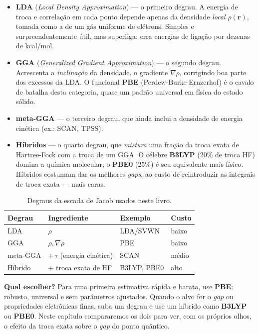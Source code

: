 \begin{itemize}[leftmargin=*]
  \item \textbf{LDA} (\emph{Local Density Approximation}) --- o primeiro degrau.
        A energia de troca e correlação em cada ponto depende apenas da densidade
        \emph{local} $\rho(\mathbf{r})$, tomada como a de um gás uniforme de
        elétrons. Simples e surpreendentemente útil, mas superliga: erra energias
        de ligação por dezenas de kcal/mol.
  \item \textbf{GGA} (\emph{Generalized Gradient Approximation}) --- o segundo
        degrau. Acrescenta a \emph{inclinação} da densidade, o gradiente
        $\nabla\rho$, corrigindo boa parte dos excessos da LDA. O funcional
        \textbf{PBE} (Perdew-Burke-Ernzerhof) é o cavalo de batalha desta
        categoria, quase um padrão universal em física do estado sólido.
  \item \textbf{meta-GGA} --- o terceiro degrau, que ainda inclui a densidade de
        energia cinética (ex.: SCAN, TPSS).
  \item \textbf{Híbridos} --- o quarto degrau, que \emph{mistura} uma fração da
        troca exata de Hartree-Fock com a troca de um GGA. O célebre \textbf{B3LYP}
        (20\% de troca HF) domina a química molecular; o \textbf{PBE0} (25\%) é seu
        equivalente mais físico. Híbridos costumam dar os melhores \emph{gaps}, ao
        custo de reintroduzir as integrais de troca exata --- mais caras.
\end{itemize}

\begin{table}[h]
  \centering
  \caption{Degraus da escada de Jacob usados neste livro.}
  \label{tab:funcionais}
  \begin{tabular}{llll}
    \toprule
    \textbf{Degrau} & \textbf{Ingrediente} & \textbf{Exemplo} & \textbf{Custo} \\
    \midrule
    LDA      & $\rho$                      & LDA/SVWN & baixo \\
    GGA      & $\rho, \nabla\rho$          & PBE      & baixo \\
    meta-GGA & $+\,\tau$ (energia cinética) & SCAN     & médio \\
    Híbrido  & $+$ troca exata de HF        & B3LYP, PBE0 & alto \\
    \bottomrule
  \end{tabular}
\end{table}

\begin{caixadica}
\textbf{Qual escolher?} Para uma primeira estimativa rápida e barata, use
\textbf{PBE}: robusto, universal e sem parâmetros ajustados. Quando o alvo for o
\emph{gap} ou propriedades eletrônicas finas, suba um degrau e use um híbrido como
\textbf{B3LYP} ou \textbf{PBE0}. Neste capítulo compararemos os dois para ver, com
os próprios olhos, o efeito da troca exata sobre o \emph{gap} do ponto quântico.
\end{caixadica}

